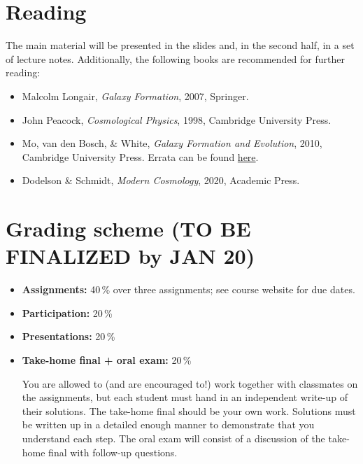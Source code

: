 \documentclass{article}
\begin{document}
\section*{Reading}

The main material will be presented in the slides and, in the second half, in 
a set of lecture notes. Additionally, the following books are recommended for
further reading:

\begin{itemize}

  \item Malcolm Longair, \emph{Galaxy Formation},
    2007, Springer.

  \item John Peacock, \emph{Cosmological Physics},
    1998, Cambridge University Press.

  \item Mo, van den Bosch, \& White, \emph{Galaxy Formation and Evolution},
    2010, Cambridge University Press. Errata can be found
    \href{http://people.umass.edu/hjmo/book/errata.pdf}{here}.

  \item Dodelson \& Schmidt, \emph{Modern Cosmology},
    2020, Academic Press.

\end{itemize}

\section*{Grading scheme (TO BE FINALIZED by JAN 20)}

\begin{itemize}

  \item {\bf Assignments:} 40\,\% over three assignments; see course website for due dates.

  \item {\bf Participation:} 20\,\%

  \item {\bf Presentations:} 20\,\%

  \item {\bf Take-home final + oral exam:} 20\,\%

You are allowed to (and are encouraged to!) work together with
classmates on the assignments, but each student must hand in an
independent write-up of their solutions. The take-home final should be
your own work. Solutions must be written up in a detailed enough
manner to demonstrate that you understand each step. The oral exam
will consist of a discussion of the take-home final with follow-up
questions.

\end{itemize}
\end{document}
